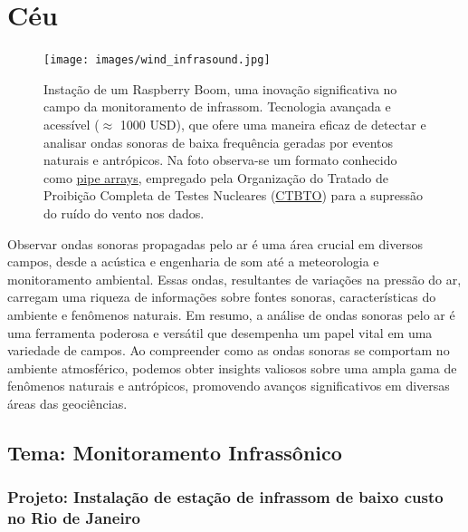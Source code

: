 \documentclass[10pt,a4paper,oneside]{book}
\newcommand{\HeroFigPad}{\vspace{-1cm}}
\begin{document}
\chapter{Céu}
\label{cap_ceu}

\begin{figure}[h]
	\HeroFigPad
	\begin{center}
		\texttt{[image: images/wind\_infrasound.jpg]}
	\end{center}
	\caption{
	Instação de um Raspberry Boom, uma inovação significativa no campo da monitoramento de infrassom. Tecnologia avançada e acessível ($\approx$ 1000 USD), que ofere uma maneira eficaz de detectar e analisar ondas sonoras de baixa frequência geradas por eventos naturais e antrópicos. Na foto observa-se um formato conhecido como \href{https://www.ctbto.org/our-work/monitoring-technologies/infrasound-monitoring}{pipe arrays}, empregado pela Organização do Tratado de Proibição Completa de Testes Nucleares (\href{https://www.ctbto.org/}{CTBTO}) para a supressão do ruído do vento nos dados.
    }
 \label{fig_wind}
\end{figure}

Observar ondas sonoras propagadas pelo ar é uma área crucial em diversos campos, desde a acústica e engenharia de som até a meteorologia e monitoramento ambiental. Essas ondas, resultantes de variações na pressão do ar, carregam uma riqueza de informações sobre fontes sonoras, características do ambiente e fenômenos naturais. Em resumo, a análise de ondas sonoras pelo ar é uma ferramenta poderosa e versátil que desempenha um papel vital em uma variedade de campos. Ao compreender como as ondas sonoras se comportam no ambiente atmosférico, podemos obter insights valiosos sobre uma ampla gama de fenômenos naturais e antrópicos, promovendo avanços significativos em diversas áreas das geociências.

\section{Tema: Monitoramento Infrassônico}

\subsection{Projeto: Instalação de estação de infrassom de baixo custo no Rio de Janeiro}
\end{document}
